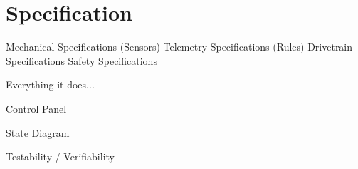 
\chapter{Specification}

Mechanical Specifications (Sensors)
Telemetry Specifications (Rules)
Drivetrain Specifications
Safety Specifications

Everything it does...


Control Panel


State Diagram


Testability / Verifiability


